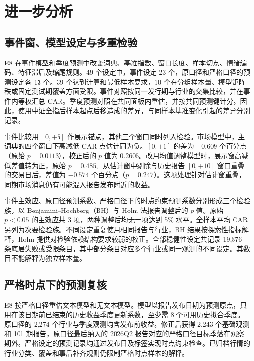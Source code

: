 \section{进一步分析}\label{sec:further}

\subsection{事件窗、模型设定与多重检验}

E8 在事件模型和季度预测中改变词典、基准指数、窗口长度、样本切点、情绪编码、特征滞后及缩尾规则。49 个设定中，事件设定 23 个，原口径和严格口径的预测设定各 13 个。39 个达到计算和最低样本要求，10 个在分组样本量、模型矩阵秩或固定测试期覆盖方面受限。事件对照按同一发行期与行业的交集比较，并在事件内等权汇总 CAR。季度预测对照在共同面板内重估，并按共同预测键计分。因此，使用中证全指后样本起点后移造成的差异，与同样本基准变化引起的差异分别记录。

事件比较用 $[0,+5]$ 作展示锚点，其他三个窗口同时列入检验。市场模型中，主词典的四个窗口下高减低 CAR 点估计同为负。$[0,+1]$ 的差为 $-0.609$ 个百分点（原始 $p=0.0113$），校正后的 $p$ 值为 0.2605。改用均值调整模型时，展示窗高减低差值转为正，原始 $p=0.485$。从估计窗中剔除与历史报告 $[0,+10]$ 窗口重叠的交易日后，差值为 $-0.574$ 个百分点（$p=0.247$）。这项处理针对估计窗重叠，同期市场消息仍有可能混入报告发布附近的收益。

事件主效应、原口径预测系数、严格口径下的时点约束预测系数分别形成三个检验族，以 Benjamini--Hochberg（BH）与 Holm 法报告调整后的 $p$ 值\cite{benjaminiHochberg1995,holm1979}。原始 $p<0.05$ 的主效应共 3 项，两种调整后均无一项达到 5\% 水平。全样本平均 CAR 另列为次要检验族。不同设定重复使用相同报告与行业，BH 结果按探索性指标解释，Holm 提供对检验依赖结构要求较弱的校正。全部稳健性设定共记录 19,876 条底层失败或受限条目，其中部分条目对应多个行业或同一观测的不同设定。其数目不能解释为独立样本量。

\subsection{严格时点下的预测复核}\label{sec:strict-timing}

E8 按严格口径重估文本模型和无文本模型。模型以报告发布日期为预测原点，只用在该日期前已结束的历史收益季度更新系数，至少需 8 个可用历史拟合季度。原口径的 2,274 个行业与季度观测均含发布前收益。修正后获得 2,243 个基础观测和 101 期报告，原口径最后纳入的 2026Q2 报告对应的严格口径目标季落在观察期外。严格设定的预测记录均通过发布日及标签实现时点约束检查。已归档行情的行业分类、覆盖和事后补齐规则仍限制严格时点样本的解释。

